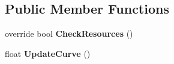\subsection*{Public Member Functions}
\begin{DoxyCompactItemize}
\item 
override bool {\bfseries Check\+Resources} ()\hypertarget{class_unity_standard_assets_1_1_image_effects_1_1_tonemapping_a2e9b0425c0f9ee9abe087130789ab8b8}{}\label{class_unity_standard_assets_1_1_image_effects_1_1_tonemapping_a2e9b0425c0f9ee9abe087130789ab8b8}

\item 
float {\bfseries Update\+Curve} ()\hypertarget{class_unity_standard_assets_1_1_image_effects_1_1_tonemapping_a10e58afe7983ea449d9883cc7961f8cb}{}\label{class_unity_standard_assets_1_1_image_effects_1_1_tonemapping_a10e58afe7983ea449d9883cc7961f8cb}

\end{DoxyCompactItemize}

